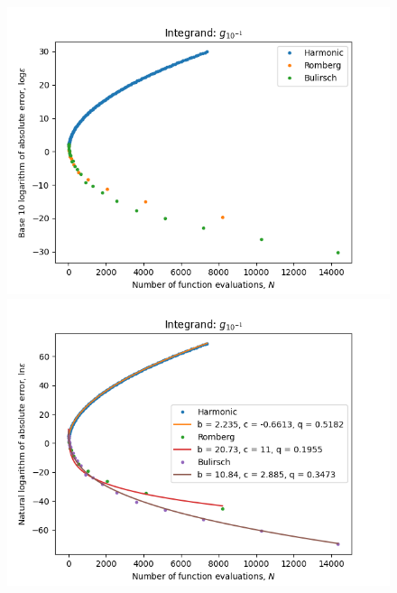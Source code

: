 \begin{figure}[H]
\centering
\begin{minipage}{0.45\textwidth}
\centering
\includegraphics[scale=0.45]{romberg_plots/g_tenth_hp.png}
\end{minipage}
\begin{minipage}{0.45\textwidth}
\centering
\includegraphics[scale=0.45]{romberg_plots/g_tenth_hp_trend.png}
\end{minipage}
\end{figure}

